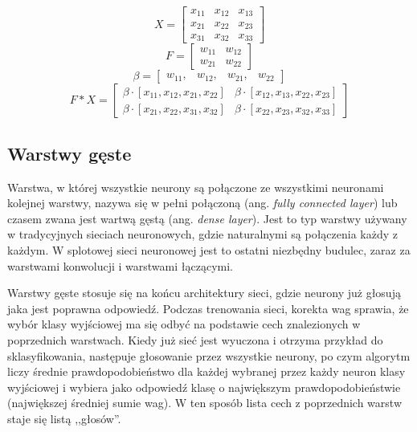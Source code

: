 \documentclass[12pt,a4paper,twoside,titlepage,openright]{book}
\begin{document}
\begin{itemize}
\begin{itemize}
 $$X = 
 \begin{bmatrix} 
 x_{11} & x_{12} & x_{13}  \\ x_{21} & x_{22} & x_{23} \\x_{31} & x_{32} & x_{33} 
 \end{bmatrix}
$$
$$F =  
 \begin{bmatrix} 
 w_{11} & w_{12} \\ w_{21} & w_{22} 
 \end{bmatrix}
$$
 $$\beta = 
 \begin{bmatrix} 
 w_{11}, & w_{12}, & w_{21}, & w_{22} 
 \end{bmatrix}
$$
 $$F * X =  
 \begin{bmatrix}  
\beta \cdot [x_{11}, x_{12}, x_{21}, x_{22}] & \beta \cdot [x_{12}, x_{13}, x_{22}, x_{23}] \\
\beta \cdot [x_{21}, x_{22}, x_{31}, x_{32}] & \beta \cdot [x_{22}, x_{23}, x_{32}, x_{33}] 
 \end{bmatrix}
$$

\subsection{Warstwy gęste}
Warstwa, w której wszystkie neurony są połączone ze wszystkimi neuronami kolejnej warstwy, nazywa się w pełni połączoną (ang. \textit{fully connected layer}) lub czasem zwana jest wartwą gęstą (ang. \textit{dense layer}). Jest to typ warstwy używany w tradycyjnych sieciach neuronowych, gdzie naturalnymi są połączenia każdy z każdym. W splotowej sieci neuronowej jest to ostatni niezbędny budulec, zaraz za warstwami konwolucji i warstwami łączącymi.

Warstwy gęste stosuje się na końcu architektury sieci, gdzie neurony już głosują jaka jest poprawna odpowiedź. Podczas trenowania sieci, korekta wag sprawia, że wybór klasy wyjściowej ma się odbyć na podstawie cech znalezionych w poprzednich warstwach. Kiedy już sieć jest wyuczona i otrzyma przykład do sklasyfikowania, następuje głosowanie przez wszystkie neurony, po czym algorytm liczy średnie prawdopodobieństwo dla każdej wybranej przez każdy neuron klasy wyjściowej i wybiera jako odpowiedź klasę o największym prawdopodobieństwie (największej średniej sumie wag). W ten sposób lista cech z poprzednich warstw staje się listą ,,głosów''.


\end{itemize}
\end{itemize}
\end{document}
